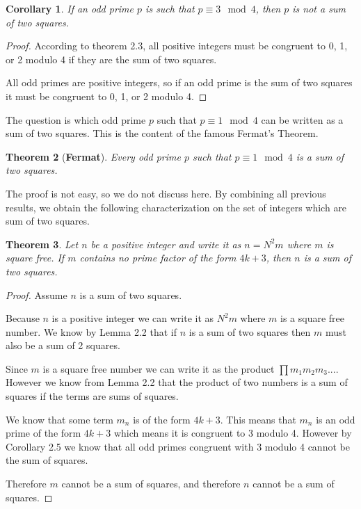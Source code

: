 \documentclass[12pt]{article}
\newtheorem{thm}{Theorem}[section]
\newtheorem{cor}[thm]{Corollary}
\begin{document}
\begin{cor} If an odd prime $p$ is such that $p\equiv 3 \mod 4$, then $p$ is not a sum of two squares.
\end{cor} 
\begin{proof}
    According to theorem 2.3, all positive integers must
    be congruent to 0, 1, or 2 modulo 4 if they are the sum
    of two squares.

    All odd primes are positive integers, so if an odd prime is
    the sum of two squares it must be congruent to 0, 1, or 2
    modulo 4.
\end{proof}

The question is which odd prime $p$ such that $p\equiv 1\mod 4$ can be written as a sum of two squares. This is the content of the famous Fermat's Theorem. 

\begin{thm}[{\bf Fermat}] Every odd prime $p$ such that $p\equiv 1\mod 4$ is a sum of two squares. 
\end{thm}

The proof is not easy, so we do not discuss here. By combining all previous results, we obtain the following characterization on the set of integers which are sum of two squares. 

\begin{thm} Let $n$ be a positive integer and write it as $n=N^2m$ where $m$ is square free. If $m$ contains no prime factor of the form $4k+3$, then $n$ is a sum of two squares. 
\end{thm}
\begin{proof}
    Assume $n$ is a sum of two squares.

    Because $n$ is a positive integer we can write it as
    $N^2 m$ where $m$ is a square free number. We know by
    Lemma 2.2 that if $n$ is a sum of two squares then $m$
    must also be a sum of 2 squares.

    Since $m$ is a square free number we can write it as the
    product $\prod m_1 m_2 m_3 ...$. However we know from Lemma 2.2
    that the product of two numbers is a sum of squares if the
    terms are sums of squares.

    We know that some term $m_n$ is of the form $4k + 3$. This
    means that $m_n$ is an odd prime of the form $4k + 3$ which
    means it is congruent to 3 modulo 4. However by Corollary
    2.5 we know that all odd primes congruent with 3 modulo
    4 cannot be the sum of squares.

    Therefore $m$ cannot be a sum of squares, and therefore
    $n$ cannot be a sum of squares.
\end{proof} 
\end{document}

